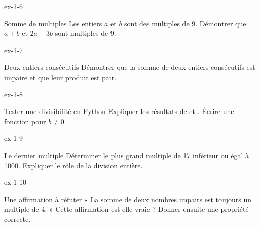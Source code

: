 \clearpage{}
\begin{blocLivre}{ex-1-6}
\begin{exercice}[2]{Somme de multiples}
Les entiers $a$ et $b$ sont des multiples de 9. Démontrer que $a+b$ et $2a-3b$ sont multiples de 9.
\end{exercice}
\end{blocLivre}
\begin{blocLivre}{ex-1-7}
\begin{exercice}[2]{Deux entiers consécutifs}
Démontrer que la somme de deux entiers consécutifs est impaire et que leur produit est pair.
\end{exercice}
\end{blocLivre}
\begin{blocLivre}{ex-1-8}
\begin{exercice}[2]{Tester une divisibilité en Python}
Expliquer les résultats de  et . Écrire une fonction  pour $b\ne0$.
\end{exercice}
\end{blocLivre}
\begin{blocLivre}{ex-1-9}
\begin{exercice}[2]{Le dernier multiple}
Déterminer le plus grand multiple de 17 inférieur ou égal à 1000. Expliquer le rôle de la division entière.
\end{exercice}
\end{blocLivre}
\begin{blocLivre}{ex-1-10}
\begin{exercice}[2]{Une affirmation à réfuter}
« La somme de deux nombres impairs est toujours un multiple de 4. » Cette affirmation est-elle vraie ? Donner ensuite une propriété correcte.
\end{exercice}
\end{blocLivre}

